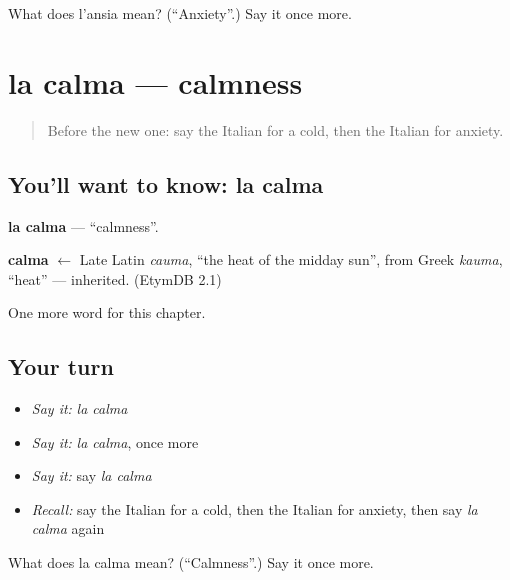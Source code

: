 \begin{tcolorbox}[breakable,colback=teal!4,colframe=teal!35!black,title={Before you move on}]
What does l'ansia mean? (\textquotedblleft{}Anxiety\textquotedblright{}.) Say it once more.
\end{tcolorbox}
\section[la calma]{la calma — calmness}

\label{lesson:IT-C186-calma}



\begin{quote}
Before the new one: say the Italian for a cold, then the Italian for anxiety.
\end{quote}

\subsection*{You'll want to know: la calma}
\textbf{la calma} — \textquotedblleft{}calmness\textquotedblright{}.

\begin{cousinweb}
\textbf{calma} $\leftarrow$ Late Latin \emph{cauma}, \textquotedblleft{}the heat of the midday sun\textquotedblright{}, from Greek \emph{kauma}, \textquotedblleft{}heat\textquotedblright{} — inherited. (EtymDB 2.1)
\end{cousinweb}

\begin{grammarlens}[title={What you've built}]
One more word for this chapter.
\end{grammarlens}

\subsection*{Your turn}
\begin{itemize}
\raggedright
  \item \emph{Say it:} \emph{la calma}
  \item \emph{Say it:} \emph{la calma}, once more
  \item \emph{Say it:} say \emph{la calma}
  \item \emph{Recall:} say the Italian for a cold, then the Italian for anxiety, then say \emph{la calma} again
\end{itemize}

\begin{tcolorbox}[breakable,colback=teal!4,colframe=teal!35!black,title={Before you move on}]
What does la calma mean? (\textquotedblleft{}Calmness\textquotedblright{}.) Say it once more.
\end{tcolorbox}
